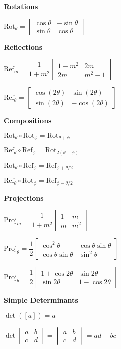 \documentclass[10pt]{article}
\newcommand\heading[1]{\medskip\textbf{#1}\medskip}
\begin{document}
\begin{multicols*}{3}
\heading{Rotations}

$\mathrm{Rot}_{\theta}=\begin{bmatrix}
    \cos\theta & -\sin\theta \\
    \sin\theta & \cos\theta 
\end{bmatrix}$

\heading{Reflections}

$\mathrm{Ref}_{m}=\dfrac{1}{1+m^2}\begin{bmatrix}
    1 - m^2 & 2m \\
    2m & m^2 - 1
\end{bmatrix}$

$\mathrm{Ref}_{\theta}=\begin{bmatrix}
    \cos(2\theta) & \sin(2\theta) \\
    \sin(2\theta) & -\cos(2\theta)
\end{bmatrix}$

\heading{Compositions}

$\mathrm{Rot}_{\theta}\circ\mathrm{Rot}_{\phi}=\mathrm{Rot}_{\theta+\phi}$

$\mathrm{Ref}_{\theta}\circ\mathrm{Ref}_{\phi}=\mathrm{Rot}_{2(\theta-\phi)}$

$\mathrm{Rot}_{\theta}\circ\mathrm{Ref}_{\phi}=\mathrm{Ref}_{\phi+\theta/2}$

$\mathrm{Ref}_{\theta}\circ\mathrm{Rot}_{\phi}=\mathrm{Ref}_{\phi-\theta/2}$

\heading{Projections}

$\mathrm{Proj}_{m}=\dfrac{1}{1+m^2}\begin{bmatrix}
    1 & m \\
    m & m^2
\end{bmatrix}$

$\mathrm{Proj}_{\theta}=\dfrac{1}{2}\begin{bmatrix}
    \cos^2\theta & \cos\theta\sin\theta \\
    \cos\theta\sin\theta & \sin^2 \theta
\end{bmatrix}$

$\mathrm{Proj}_{\theta}=\dfrac{1}{2}\begin{bmatrix}
    1+\cos 2\theta & \sin 2\theta \\
    \sin 2\theta & 1 - \cos 2\theta  
\end{bmatrix}$

\heading{Simple Determinants}

$\det([a])=a$

$\det\begin{bmatrix}
    a & b \\
    c & d
\end{bmatrix} = \begin{vmatrix}
    a & b \\
    c & d
\end{vmatrix} = ad-bc$


\end{multicols*}
\end{document}
